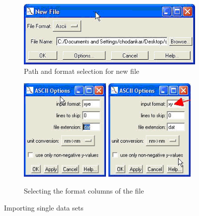 \begin{figure}[htb]
\begin{subfigure}[b]{.48\textwidth}
   \centering
    \includegraphics[width=\textwidth]{QTNewFile.png}
   \caption{Path and format selection for new file}
   \label{fig:QTNewFile}
\end{subfigure}
\hfill
\begin{subfigure}[b]{.48\textwidth}
   \centering
   \includegraphics[width=0.48\textwidth]{QTascii1.png} \hfill
   \includegraphics[width=0.48\textwidth]{QTascii2.png}
   \caption{Selecting the format columns of the file}
   \label{fig:QTascii1}
\end{subfigure}
\caption{Importing single data sets} \label{fig:QTNewFileDS}
\end{figure}

